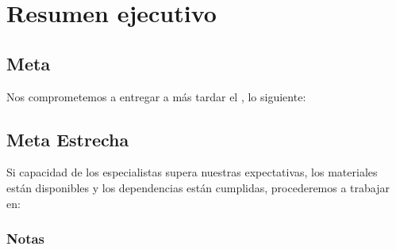 \chapter{Resumen ejecutivo}

\section{Meta}
Nos comprometemos a entregar a más tardar el \textbf{\axSprintEnd}, lo siguiente:

\axSprintGoal

\section{Meta Estrecha}
Si capacidad de los especialistas supera nuestras expectativas, los materiales están 
disponibles y los dependencias están cumplidas, procederemos a trabajar en:

\axSprintStretchGoal

\subsection{Notas}
\axSprintStretchGoalNotes